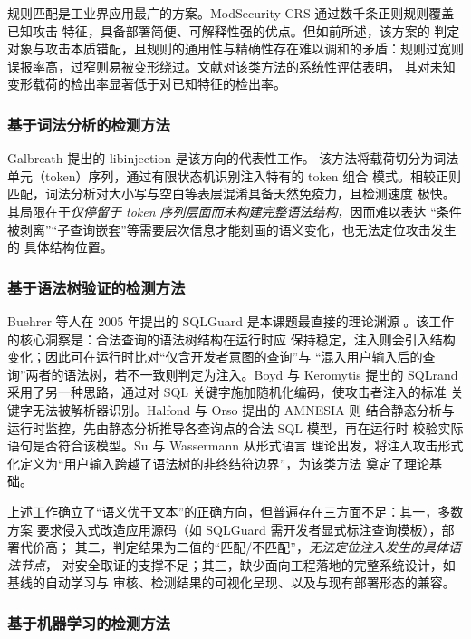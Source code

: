 规则匹配是工业界应用最广的方案。ModSecurity CRS 通过数千条正则规则覆盖已知攻击
特征，具备部署简便、可解释性强的优点\cite{owasp2023crs}。但如前所述，该方案的
判定对象与攻击本质错配，且规则的通用性与精确性存在难以调和的矛盾：规则过宽则
误报率高，过窄则易被变形绕过。文献\cite{cui2018survey}对该类方法的系统性评估表明，
其对未知变形载荷的检出率显著低于对已知特征的检出率。

\subsubsection{基于词法分析的检测方法}

Galbreath 提出的 libinjection 是该方向的代表性工作\cite{galbreath2012libinjection}。
该方法将载荷切分为词法单元（token）序列，通过有限状态机识别注入特有的 token 组合
模式。相较正则匹配，词法分析对大小写与空白等表层混淆具备天然免疫力，且检测速度
极快。其局限在于\emph{仅停留于 token 序列层面而未构建完整语法结构}，因而难以表达
“条件被剥离”“子查询嵌套”等需要层次信息才能刻画的语义变化，也无法定位攻击发生的
具体结构位置。

\subsubsection{基于语法树验证的检测方法}

Buehrer 等人在 2005 年提出的 SQLGuard 是本课题最直接的理论渊源
\cite{buehrer2005sqlguard}。该工作的核心洞察是：合法查询的语法树结构在运行时应
保持稳定，注入则会引入结构变化；因此可在运行时比对“仅含开发者意图的查询”与
“混入用户输入后的查询”两者的语法树，若不一致则判定为注入。Boyd 与 Keromytis 提出的
SQLrand 采用了另一种思路，通过对 SQL 关键字施加随机化编码，使攻击者注入的标准
关键字无法被解析器识别\cite{boyd2004sqlrand}。Halfond 与 Orso 提出的 AMNESIA 则
结合静态分析与运行时监控，先由静态分析推导各查询点的合法 SQL 模型，再在运行时
校验实际语句是否符合该模型\cite{halfond2006amnesia}。Su 与 Wassermann 从形式语言
理论出发，将注入攻击形式化定义为“用户输入跨越了语法树的非终结符边界”，为该类方法
奠定了理论基础\cite{su2006essence}。

上述工作确立了“语义优于文本”的正确方向，但普遍存在三方面不足：其一，多数方案
要求侵入式改造应用源码（如 SQLGuard 需开发者显式标注查询模板），部署代价高；
其二，判定结果为二值的“匹配/不匹配”，\emph{无法定位注入发生的具体语法节点}，
对安全取证的支撑不足；其三，缺少面向工程落地的完整系统设计，如基线的自动学习与
审核、检测结果的可视化呈现、以及与现有部署形态的兼容。

\subsubsection{基于机器学习的检测方法}

